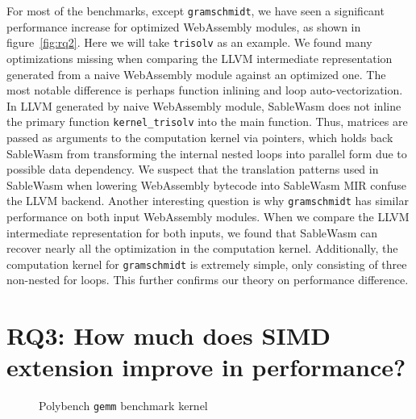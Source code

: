 For most of the benchmarks, except \texttt{gramschmidt}, we have seen a significant performance increase for optimized WebAssembly modules, as shown in figure~\ref{fig:rq2}. Here we will take \texttt{trisolv} as an example. We found many optimizations missing when comparing the LLVM intermediate representation generated from a naive WebAssembly module against an optimized one. The most notable difference is perhaps function inlining and loop auto-vectorization. In LLVM generated by naive WebAssembly module, SableWasm does not inline the primary function \texttt{kernel\_trisolv} into the main function. Thus, matrices are passed as arguments to the computation kernel via pointers, which holds back SableWasm from transforming the internal nested loops into parallel form due to possible data dependency. We suspect that the translation patterns used in SableWasm when lowering WebAssembly bytecode into SableWasm MIR confuse the LLVM backend. Another interesting question is why \texttt{gramschmidt} has similar performance on both input WebAssembly modules. When we compare the LLVM intermediate representation for both inputs, we found that SableWasm can recover nearly all the optimization in the computation kernel. Additionally, the computation kernel for \texttt{gramschmidt} is extremely simple, only consisting of three non-nested for loops. This further confirms our theory on performance difference.

\section[RQ3: How much does SIMD extension improve in performance?]{
  {\large RQ3: How much does SIMD extension improve in performance?}}

\begin{figure}
    
    \caption{Polybench \texttt{gemm} benchmark kernel}
    \label{fig:polybench-gemm-kernel}
\end{figure}

